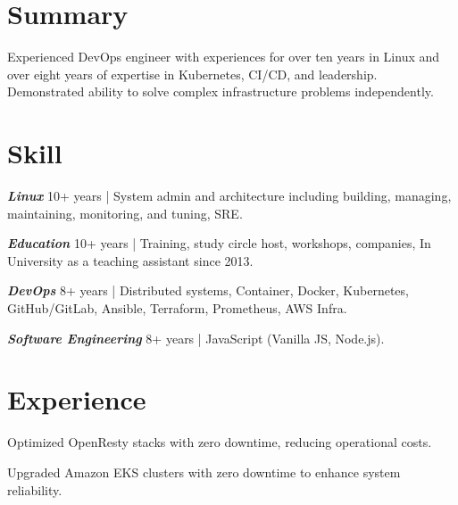 \documentclass[]{deedy-resume-openfont}
\begin{document}
\begin{minipage}[t]{1\textwidth}



\section{Summary}
\begin{summary}
    Experienced DevOps engineer with experiences for over ten years in Linux and over eight years of expertise in Kubernetes, CI/CD, and leadership. Demonstrated ability to solve complex infrastructure problems independently.
\end{summary}

\section{Skill}
\vspace{\topsep}
\begin{tightemize}
    \item \textbf{\emph{Linux}} 10+ years | System admin and architecture including building, managing, maintaining, monitoring, and tuning, SRE.
    \item \textbf{\emph{Education}} 10+ years | Training, study circle host, workshops, companies, In University as a teaching assistant since 2013.
    \item \textbf{\emph{DevOps}} 8+ years | Distributed systems, Container, Docker, Kubernetes, GitHub/GitLab, Ansible, Terraform, Prometheus, AWS Infra.
    \item \textbf{\emph{Software Engineering}}  8+ years | JavaScript (Vanilla JS, Node.js).
\end{tightemize}


\section{Experience}


\null\hfill{}
\begin{tightemize}
    \item Optimized OpenResty stacks with zero downtime, reducing operational costs.
    \item Upgraded Amazon EKS clusters with zero downtime to enhance system reliability.
\end{tightemize}
\sectionsep



\end{minipage}
\end{document}
